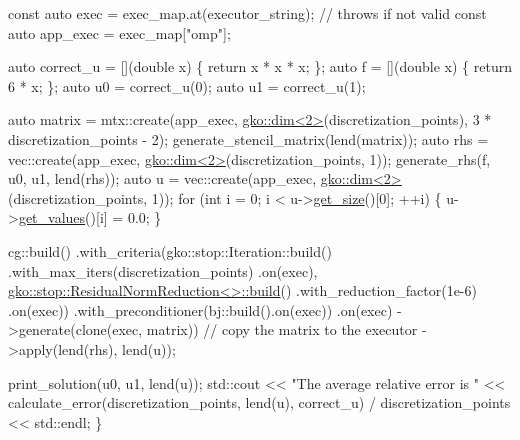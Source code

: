 \begin{DoxyCodeInclude}
    \textcolor{keyword}{const} \textcolor{keyword}{auto} exec = exec\_map.at(executor\_string);  \textcolor{comment}{// throws if not valid}
    \textcolor{keyword}{const} \textcolor{keyword}{auto} app\_exec = exec\_map[\textcolor{stringliteral}{"omp"}];

    \textcolor{keyword}{auto} correct\_u = [](\textcolor{keywordtype}{double} x) \{ \textcolor{keywordflow}{return} x * x * x; \};
    \textcolor{keyword}{auto} f = [](\textcolor{keywordtype}{double} x) \{ \textcolor{keywordflow}{return} 6 * x; \};
    \textcolor{keyword}{auto} u0 = correct\_u(0);
    \textcolor{keyword}{auto} u1 = correct\_u(1);

    \textcolor{keyword}{auto} matrix = mtx::create(app\_exec, \hyperlink{structgko_1_1dim}{gko::dim<2>}(discretization\_points),
                              3 * discretization\_points - 2);
    generate\_stencil\_matrix(lend(matrix));
    \textcolor{keyword}{auto} rhs = vec::create(app\_exec, \hyperlink{structgko_1_1dim}{gko::dim<2>}(discretization\_points, 1));
    generate\_rhs(f, u0, u1, lend(rhs));
    \textcolor{keyword}{auto} u = vec::create(app\_exec, \hyperlink{structgko_1_1dim}{gko::dim<2>}(discretization\_points, 1));
    \textcolor{keywordflow}{for} (\textcolor{keywordtype}{int} i = 0; i < u->\hyperlink{classgko_1_1LinOp_a31b3c003388eb0b95393154f68c2b98d}{get\_size}()[0]; ++i) \{
        u->\hyperlink{classgko_1_1matrix_1_1Dense_a3bc458e02fab8e4c9f60f70bd4d5a4f9}{get\_values}()[i] = 0.0;
    \}

    cg::build()
        .with\_criteria(gko::stop::Iteration::build()
                           .with\_max\_iters(discretization\_points)
                           .on(exec),
                       \hyperlink{classgko_1_1stop_1_1ResidualNormReduction}{gko::stop::ResidualNormReduction<>::build}()
                           .with\_reduction\_factor(1e-6)
                           .on(exec))
        .with\_preconditioner(bj::build().on(exec))
        .on(exec)
        ->generate(clone(exec, matrix))  \textcolor{comment}{// copy the matrix to the executor}
        ->apply(lend(rhs), lend(u));

    print\_solution(u0, u1, lend(u));
    std::cout << \textcolor{stringliteral}{"The average relative error is "}
              << calculate\_error(discretization\_points, lend(u), correct\_u) /
                     discretization\_points
              << std::endl;
\}
\end{DoxyCodeInclude}
 